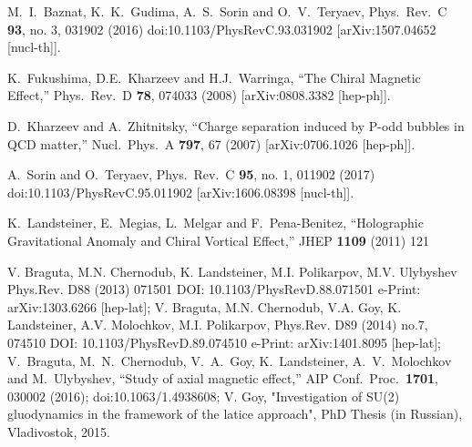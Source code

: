 \documentclass[preprint,aps,showpacs,nofootinbib,superscriptaddress,preprintnumbers,epsf,psf]{revtex4}
\begin{document}
\begin{thebibliography}{99}
  M.~I.~Baznat, K.~K.~Gudima, A.~S.~Sorin and O.~V.~Teryaev,
  Phys.\ Rev.\ C {\bf 93}, no. 3, 031902 (2016)
  doi:10.1103/PhysRevC.93.031902
  [arXiv:1507.04652 [nucl-th]].




  K.~Fukushima, D.E.~Kharzeev and H.J.~Warringa,
  ``The Chiral Magnetic Effect,''
  Phys.\ Rev.\  D {\bf 78}, 074033 (2008)
  [arXiv:0808.3382 [hep-ph]].

  D.~Kharzeev and A.~Zhitnitsky,
``Charge separation induced by P-odd bubbles in QCD matter,''
  Nucl.\ Phys.\  A {\bf 797}, 67 (2007)
  [arXiv:0706.1026 [hep-ph]].

  A.~Sorin and O.~Teryaev,
  Phys.\ Rev.\ C {\bf 95}, no. 1, 011902 (2017)
  doi:10.1103/PhysRevC.95.011902
  [arXiv:1606.08398 [nucl-th]].



  K.~Landsteiner, E.~Megias, L.~Melgar and F.~Pena-Benitez,
  ``Holographic Gravitational Anomaly and Chiral Vortical Effect,''
  JHEP {\bf 1109} (2011) 121



V. Braguta, M.N. Chernodub, K. Landsteiner, M.I. Polikarpov, M.V.
Ulybyshev Phys.Rev. D88 (2013) 071501 DOI:
10.1103/PhysRevD.88.071501 e-Print: arXiv:1303.6266 [hep-lat]; V.
Braguta, M.N. Chernodub, V.A. Goy, K. Landsteiner, A.V. Molochkov,
M.I. Polikarpov, Phys.Rev. D89 (2014) no.7, 074510 DOI:
10.1103/PhysRevD.89.074510 e-Print: arXiv:1401.8095 [hep-lat];
V.~Braguta, M.~N.~Chernodub, V.~A.~Goy, K.~Landsteiner,
A.~V.~Molochkov and M.~Ulybyshev,
  ``Study of axial magnetic effect,''
  AIP Conf.\ Proc.\  {\bf 1701}, 030002 (2016);
  doi:10.1063/1.4938608;
V. Goy, "Investigation of SU(2) gluodynamics in the framework of the
latice approach", PhD Thesis (in Russian), Vladivostok, 2015.





\end{thebibliography}
\end{document}

